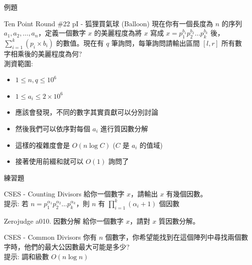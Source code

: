 \documentclass[aspectratio=169]{beamer}
\begin{document}
\begin{frame}{例題}
    \begin{block}{Ten Point Round \#22 pI - 狐狸買氣球 (Balloon)}
        現在你有一個長度為 $n$ 的序列 $a_1, a_2, \dots, a_n$，定義一個數字 $x$ 的美麗程度為將 $x$ 寫成 $x = p_1^{b_1} p_2^{b_2} \ldots p_k^{b_k}$ 後，$\sum\limits_{i=1}^k (p_i \times b_i)$ 的數值。現在有 $q$ 筆詢問，每筆詢問請輸出區間 $[l,r]$ 所有數字相乘後的美麗程度為何? \\
        \vspace{5mm}
        測資範圍: 
        \begin{itemize}
            \item $1 \le n,q \le 10^6$
            \item $1 \le a_i \le 2 \times 10^6$
        \end{itemize}
    \end{block}
    \begin{itemize}
        \item 應該會發現，不同的數字其實貢獻可以分別討論
        \item 然後我們可以依序對每個 $a_i$ 進行質因數分解
        \item 這樣的複雜度會是 $O(n \log C)$ ($C$ 是 $a_i$ 的值域)
        \item 接著使用前綴和就可以 $O(1)$ 詢問了
    \end{itemize}
\end{frame}

\begin{frame}{練習題}
    \begin{block}{CSES - Counting Divisors}
        給你一個數字 $x$，請輸出 $x$ 有幾個因數。\\
        \vspace{5mm}
        提示: 若 $n=p_1^{\alpha_1} p_2^{\alpha_2} \dots p_k^{\alpha_k}$，則 $n$ 有 $\prod_{i=1}^k (\alpha_i+1)$ 個因數
    \end{block}
    \begin{block}{Zerojudge a010. 因數分解}
        給你一個數字 $x$，請對 $x$ 質因數分解。
    \end{block}
    \begin{block}{CSES - Common Divisors}
        你有 $n$ 個數字，你希望能找到在這個陣列中尋找兩個數字時，他們的最大公因數最大可能是多少?\\
        \vspace{5mm}
        提示: 調和級數 $O(n \log n)$
    \end{block}
\end{frame}
\end{document}
